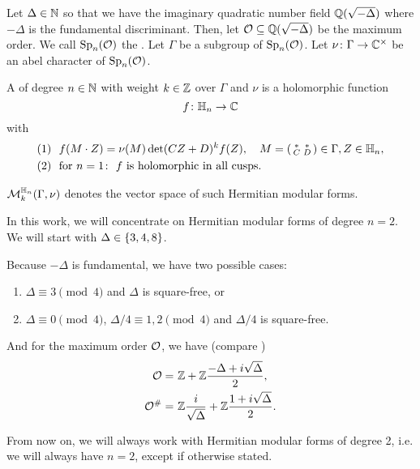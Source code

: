 
Let $\Delta \in \mathbb{N}$ so that we have the imaginary quadratic number field $\mathbb{Q}(\sqrt{-\Delta})$ where $-\Delta$ is the fundamental discriminant.
Then, let $\mathcal{O} \subseteq \mathbb{Q}(\sqrt{-\Delta})$ be the maximum order.
We call $\operatorname{Sp}_n(\mathcal{O})$ the .
Let $\Gamma$ be a subgroup of $\operatorname{Sp}_n(\mathcal{O})$.
Let $\nu \colon \Gamma \rightarrow \mathbb{C}^\times$ be an abel character of $\operatorname{Sp}_n(\mathcal{O})$.

A 
of degree $n\in\mathbb{N}$
with weight $k\in \mathbb{Z}$
over $\Gamma$ and $\nu$
is a holomorphic function
\[ f \colon \mathbb{H}_n \rightarrow \mathbb{C} \]
with
\begin{align*}
(1) \ \ & f(M \cdot Z) = \nu(M) \det(CZ + D)^k f(Z), \quad M = \left( \begin{smallmatrix} * & * \\ C & D \end{smallmatrix} \right) \in \Gamma, Z \in \mathbb{H}_n , \\
(2) \ \ & \text{for } n = 1 \colon \ \text{$f$ is holomorphic in all cusps} .
\end{align*}

$\operatorname{\mathcal{M}}^{\mathbb{H}_{n}}_k (\Gamma,\nu)$
denotes the vector space of such Hermitian modular forms.

In this work, we will concentrate on Hermitian modular forms of degree $n=2$. We will start with $\Delta \in \Set{3,4,8}$.

Because $-\Delta$ is fundamental, we have two possible cases:
\begin{enumerate}
\item $\Delta \equiv 3 \pmod{4}$ and $\Delta$ is square-free, or
\item $\Delta \equiv 0 \pmod{4}$, $\Delta/4 \equiv 1,2 \pmod{4}$ and $\Delta/4$ is square-free.
\end{enumerate}
And for the maximum order $\mathcal{O}$, we have (compare \cite{Dern01Herm})
\begin{align*}
\mathcal{O} = &\ \mathbb{Z} +  \mathbb{Z} \frac{-\Delta+i\sqrt{\Delta}}{2} , \\
\mathcal{O}^\# = & \ \mathbb{Z} \frac{i}{\sqrt{\Delta}} + \mathbb{Z} \frac{1 + i\sqrt{\Delta}}{2} .
\end{align*}

From now on, we will always work with Hermitian modular forms of degree 2, i.e. we will always have $n=2$, except if otherwise stated.

